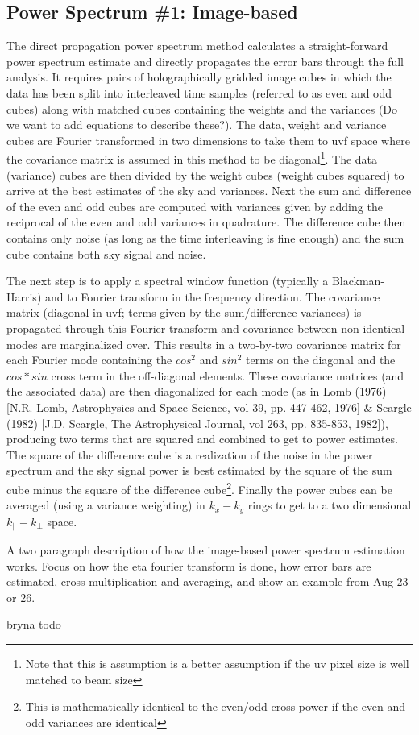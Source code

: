 \subsection{Power Spectrum \#1: Image-based}
The direct propagation power spectrum method calculates a straight-forward power spectrum estimate and directly propagates the error bars through the full analysis. It requires pairs of holographically gridded image cubes in which the data has been split into interleaved time samples (referred to as even and odd cubes) along with matched cubes containing the weights and the variances (Do we want to add equations to describe these?).  The data, weight and variance cubes are Fourier transformed in two dimensions to take them to uvf space where the covariance matrix is assumed in this method to be diagonal\footnote{Note that this is assumption is a better assumption if the uv pixel size is well matched to beam size}. The data (variance) cubes are then divided by the weight cubes (weight cubes squared) to arrive at the best estimates of the sky and variances. Next the sum and difference of the even and odd cubes are computed with variances given by adding the reciprocal of the even and odd variances in quadrature. The difference cube then contains only noise (as long as the time interleaving is fine enough) and the sum cube contains both sky signal and noise.

The next step is to apply a spectral window function (typically a Blackman-Harris) and to Fourier transform in the frequency direction. The covariance matrix (diagonal in uvf; terms given by the sum/difference variances) is propagated through this Fourier transform and covariance between non-identical modes are marginalized over. This results in a two-by-two covariance matrix for each Fourier mode containing the $cos^2$ and $sin^2$ terms on the diagonal and the $cos*sin$ cross term in the off-diagonal elements. These covariance matrices (and the associated data) are then diagonalized for each mode (as in Lomb (1976) [N.R. Lomb, Astrophysics and Space Science, vol 39, pp. 447-462, 1976] & Scargle (1982) [J.D. Scargle, The Astrophysical Journal, vol 263, pp. 835-853, 1982]), producing two terms that are squared and combined to get to power estimates. The square of the difference cube is a realization of the noise in the power spectrum and the sky signal power is best estimated by the square of the sum cube minus the square of the difference cube\footnote{This is mathematically identical to the even/odd cross power if the even and odd variances are identical}. Finally the power cubes can be averaged (using a variance weighting) in $k_x-k_y$ rings to get to a two dimensional $k_{\|}-k_{\bot}$ space.


A two paragraph description of how the image-based power spectrum estimation works. Focus on how the eta fourier transform is done, how error bars are estimated, cross-multiplication and averaging, and show an example from Aug 23 or 26.

bryna todo